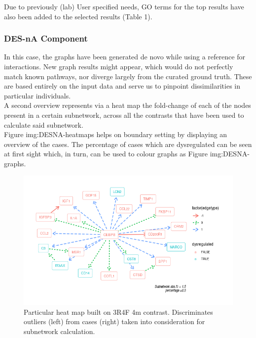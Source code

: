 Due to previously (lab) User specified needs, GO terms for the top results have also been added to the selected results (Table 1).

\subsubsection{DES-nA Component}
In this case, the graphs have been generated de novo while using a reference for interactions. New graph results might appear, which would do not perfectly match known pathways, nor diverge largely from the curated ground truth. These are based entirely on the input data and serve us to pinpoint dissimilarities in particular individuals.
\\

A second overview represents via a heat map the fold-change of each of the nodes present in a certain subnetwork, across all the contrasts that have been used to calculate said subnetwork. 
\\

Figure img:DESNA-heatmaps helps on boundary setting by displaying an overview of the cases. The percentage of cases which are dysregulated can be seen at first sight which, in turn, can be used to colour graphs as Figure img:DESNA-graphs. 
\\

\begin{figure}
    \centering
    \includegraphics[width=\textwidth]{Major Thesis/figures/desna/desna-network.png}
    \caption{Particular heat map built on 3R4F 4m contrast. Discriminates outliers (left) from cases (right) taken into consideration for subnetwork calculation.}
    \label{fig:desna-network}
\end{figure}

